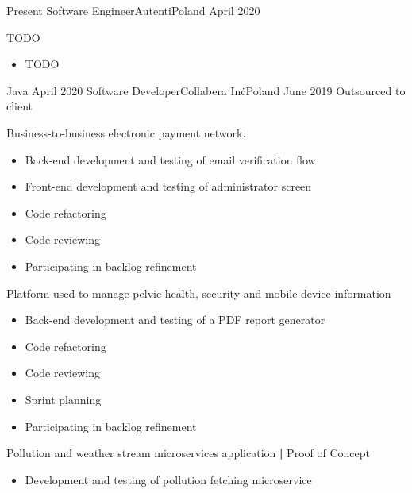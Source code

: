 
\begin{experiences}
  \experience
    {Present} {Software Engineer}{Autenti}{Poland}
    {April 2020}    {
                        TODO
                        \begin{itemize}
                            \item TODO
                        \end{itemize}
                    }
                    {Java}
  \emptySeparator
  \contractorexperience
    {April 2020}   {Software Developer}{Collabera Inc\.}{Poland}
    {June 2019} {Outsourced to client}
                {
                        Business-to-business electronic payment network.
                        \begin{itemize}
                            \item Back-end development and testing of email verification flow
                            \item Front-end development and testing of administrator screen
                            \item Code refactoring
                            \item Code reviewing
                            \item Participating in backlog refinement
                        \end{itemize}                
                        Platform used to manage pelvic health, security and mobile device information
                        \begin{itemize}
                            \item Back-end development and testing of a PDF report generator
                            \item Code refactoring
                            \item Code reviewing
                            \item Sprint planning
                            \item Participating in backlog refinement
                        \end{itemize}
                        Pollution and weather stream microservices application \textbf{|} \small{Proof of Concept}\normalsize
                        \begin{itemize}
                            \item Development and testing of pollution fetching microservice

\end{itemize}}
\end{experiences}

